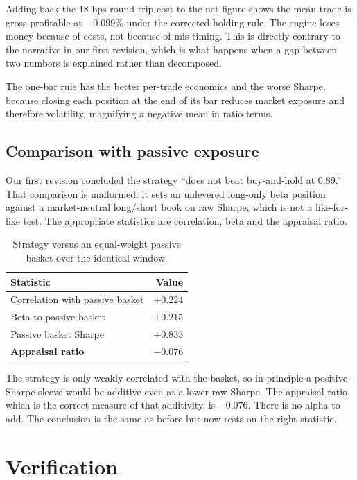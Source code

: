\documentclass[preprint,12pt,authoryear]{elsarticle}
\begin{document}
Adding back the $18$ bps round-trip cost to the net figure shows the mean trade is
gross-profitable at $+0.099\%$ under the corrected holding rule. The engine loses
money because of costs, not because of mis-timing. This is directly contrary to
the narrative in our first revision, which is what happens when a gap between two
numbers is explained rather than decomposed.

The one-bar rule has the better per-trade economics and the worse Sharpe, because
closing each position at the end of its bar reduces market exposure and therefore
volatility, magnifying a negative mean in ratio terms.

\subsection{Comparison with passive exposure}
\label{ssec:bench}

Our first revision concluded the strategy ``does not beat buy-and-hold at
$0.89$.'' That comparison is malformed: it sets an unlevered long-only beta
position against a market-neutral long/short book on raw Sharpe, which is not a
like-for-like test. The appropriate statistics are correlation, beta and the
appraisal ratio.

\begin{table}[t]\centering\small
\caption{Strategy versus an equal-weight passive basket over the identical
window.}
\label{tab:bench}
\begin{tabular}{@{}lr@{}}
\toprule
Statistic & Value \\
\midrule
Correlation with passive basket & $+0.224$ \\
Beta to passive basket          & $+0.215$ \\
Passive basket Sharpe           & $+0.833$ \\
\textbf{Appraisal ratio}        & $\mathbf{-0.076}$ \\
\bottomrule
\end{tabular}
\end{table}

The strategy is only weakly correlated with the basket, so in principle a
positive-Sharpe sleeve would be additive even at a lower raw Sharpe. The
appraisal ratio, which is the correct measure of that additivity, is $-0.076$.
There is no alpha to add. The conclusion is the same as before but now rests on
the right statistic.

\section{Verification}
\label{sec:verification}
\end{document}
